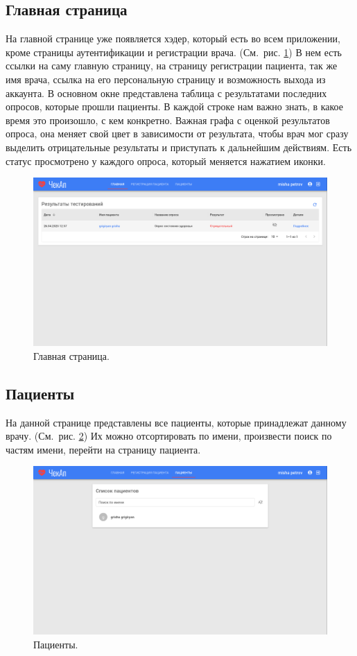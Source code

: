 \subsection{Главная страница}\label{subsec:-2}
На главной странице уже появляется хэдер, который есть во всем приложении, кроме страницы аутентификации и регистрации врача.
(См.\ рис. \ref{fig:figure5})
В нем есть ссылки на саму главную страницу, на страницу регистрации пациента, так же имя врача, ссылка на его персональную страницу и возможность выхода из аккаунта.
В основном окне представлена таблица с результатами последних опросов, которые прошли пациенты.
В каждой строке нам важно знать, в какое время это произошло, с кем конкретно.
Важная графа с оценкой результатов опроса, она меняет свой цвет в зависимости от результата, чтобы врач мог сразу выделить отрицательные результаты и приступать к дальнейшим действиям.
Есть статус просмотрено у каждого опроса, который меняется нажатием иконки.
\begin{figure}[ht]
    \includegraphics[width=\textwidth]{images/screenshots/main_page}
    \caption{Главная страница.}
    \label{fig:figure5}
\end{figure}

\subsection{Пациенты}\label{subsec:-22}
На данной странице представлены все пациенты, которые принадлежат данному врачу.
(См.\ рис. \ref{fig:figure51})
Их можно отсортировать по имени, произвести поиск по частям имени, перейти на страницу пациента.
\begin{figure}[ht]
    \includegraphics[width=\textwidth]{images/screenshots/patients}
    \caption{Пациенты.}
    \label{fig:figure51}
\end{figure}


